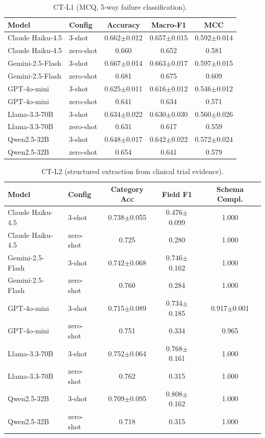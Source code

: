 \begin{table}[h]
\centering
\caption{CT-L1 (MCQ, 5-way failure classification).}
\label{tab:ct_l1_full}
\scriptsize
\begin{tabular}{@{}llccc@{}}
\toprule
\textbf{Model} & \textbf{Config} & \textbf{Accuracy} & \textbf{Macro-F1} & \textbf{MCC} \\
\midrule
Claude Haiku-4.5 & 3-shot & 0.662$\pm$0.012 & 0.657$\pm$0.015 & 0.592$\pm$0.014 \\
Claude Haiku-4.5 & zero-shot & 0.660 & 0.652 & 0.581 \\
Gemini-2.5-Flash & 3-shot & 0.667$\pm$0.014 & 0.663$\pm$0.017 & 0.597$\pm$0.015 \\
Gemini-2.5-Flash & zero-shot & 0.681 & 0.675 & 0.609 \\
GPT-4o-mini & 3-shot & 0.625$\pm$0.011 & 0.616$\pm$0.012 & 0.546$\pm$0.012 \\
GPT-4o-mini & zero-shot & 0.641 & 0.634 & 0.571 \\
Llama-3.3-70B & 3-shot & 0.634$\pm$0.022 & 0.630$\pm$0.030 & 0.560$\pm$0.026 \\
Llama-3.3-70B & zero-shot & 0.631 & 0.617 & 0.559 \\
Qwen2.5-32B & 3-shot & 0.648$\pm$0.017 & 0.642$\pm$0.022 & 0.572$\pm$0.024 \\
Qwen2.5-32B & zero-shot & 0.654 & 0.641 & 0.579 \\
\bottomrule
\end{tabular}
\end{table}

\begin{table}[h]
\centering
\caption{CT-L2 (structured extraction from clinical trial evidence).}
\label{tab:ct_l2_full}
\scriptsize
\begin{tabular}{@{}llccc@{}}
\toprule
\textbf{Model} & \textbf{Config} & \textbf{Category Acc} & \textbf{Field F1} & \textbf{Schema Compl.} \\
\midrule
Claude Haiku-4.5 & 3-shot & 0.738$\pm$0.055 & 0.476$\pm$0.099 & 1.000 \\
Claude Haiku-4.5 & zero-shot & 0.725 & 0.280 & 1.000 \\
Gemini-2.5-Flash & 3-shot & 0.742$\pm$0.068 & 0.746$\pm$0.162 & 1.000 \\
Gemini-2.5-Flash & zero-shot & 0.760 & 0.284 & 1.000 \\
GPT-4o-mini & 3-shot & 0.715$\pm$0.089 & 0.734$\pm$0.185 & 0.917$\pm$0.001 \\
GPT-4o-mini & zero-shot & 0.751 & 0.334 & 0.965 \\
Llama-3.3-70B & 3-shot & 0.752$\pm$0.064 & 0.768$\pm$0.161 & 1.000 \\
Llama-3.3-70B & zero-shot & 0.762 & 0.315 & 1.000 \\
Qwen2.5-32B & 3-shot & 0.709$\pm$0.095 & 0.808$\pm$0.162 & 1.000 \\
Qwen2.5-32B & zero-shot & 0.718 & 0.315 & 1.000 \\
\bottomrule
\end{tabular}
\end{table}

